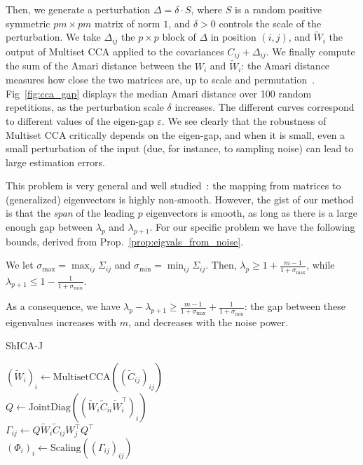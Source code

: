 %
Then, we generate a perturbation $\Delta = \delta \cdot S$, where $S$ is a random positive symmetric $pm \times pm$ matrix of norm $1$, and $\delta >0$ controls the scale of the perturbation. 
%
We take $\Delta_{ij}$ the $p\times p$ block of $\Delta$ in position $(i, j)$, and $\tilde{W}_i$ the output of Multiset CCA applied to the covariances $C_{ij} + \Delta_{ij}$.
%
We finally compute the sum of the Amari distance between the $W_i$ and $\tilde{W}_i$: the Amari distance measures how close the two matrices are, up to scale and permutation~\cite{amari1996new}.
Fig~\ref{fig:cca_gap} displays the median Amari distance over 100 random repetitions, as the perturbation scale $\delta$ increases. The different curves correspond to different values of the eigen-gap $\varepsilon$. We see clearly that the robustness of Multiset CCA critically depends on the eigen-gap, and when it is small, even a small perturbation of the input (due, for instance, to sampling noise) can lead to large estimation errors.


This problem is very general and well studied~\cite{stewart1973error}: the mapping from matrices to (generalized) eigenvectors is highly non-smooth.
%
However, the gist of our method is that the \emph{span} of the leading $p$ eigenvectors is smooth, as long as there is a large enough gap between  $\lambda_p$ and $\lambda_{p+1}$.
For our specific problem we have the following bounds, derived from Prop.~\ref{prop:eigvals_from_noise}.
\begin{prop}
  We let $\sigma_{\max} = \max_{ij}\Sigma_{ij}$ and $\sigma_{\min} = \min_{ij}\Sigma_{ij}$. Then, $\lambda_p \geq 1 + \frac{m-1}{1+\sigma_{\max}}$, while $\lambda_{p+1}\leq 1 - \frac{1}{1 + \sigma_{min}}$.
\end{prop}
As a consequence, we have $\lambda_{p} -\lambda_{p+1} \geq \frac{m-1}{1+\sigma_{\max}} + \frac{1}{1+ \sigma_{\min}}$: the gap between these eigenvalues increases with $m$, and decreases with the noise power.

  \begin{algorithm}[H]
    \SetAlgoLined
  \caption{ShICA-J}
  \label{algo:shicaj}
    $(\tilde{W}_i)_i \leftarrow \mathrm{MultisetCCA}((\tilde{C}_{ij})_{ij})$ \\
        $Q \leftarrow
        \mathrm{JointDiag}((\tilde{W}_i\tilde{C}_{ii}\tilde{W}_i^{\top})_i)$ \\
       $\Gamma_{ij} \leftarrow Q\tilde{W}_i\tilde{C}_{ij}W_j^\top Q^\top$ \\
       $(\Phi_i)_i \leftarrow \mathrm{Scaling}((\Gamma_{ij})_{ij})$ \\
  \end{algorithm}


